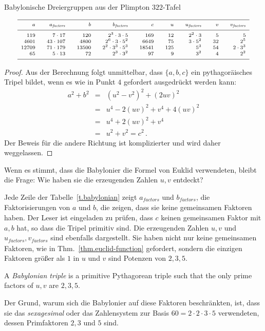 \begin{table}[b]
\caption{Babylonische Dreiergruppen aus der Plimpton $322$-Tafel}\label{t.babylonian}
\[
\begin{scriptsize}
\begin{array}{r@{$\quad\quad$}r@{$\quad\quad$}r@{$\quad\quad$}r@{$\quad\quad$}r@{$\quad\quad$}r@{$\quad\quad$}r@{$\quad\quad$}r@{$\quad\quad$}r}
\hline
\noalign{\smallskip}
a&a_{\textit{factors}}&b&b_{\textit{factors}}&c&u&u_{\textit{factors}}&v&v_{\textit{factors}}\\
\noalign{\smallskip}\hline\noalign{\smallskip}
119&7\cdot 17 &120&2^3 \cdot 3\cdot 5 & 169&12&2^2\cdot 3&5&5\\
4601 &43\cdot 107&4800&2^6 \cdot 3 \cdot 5^2& 6649&75&3\cdot 5^2&32&2^5\\
12709 &71\cdot 179&13500&2^2 \cdot 3^3 \cdot 5^3& 18541&125&5^3&54&2\cdot 3^3\\
65 &5\cdot 13&72&2^3 \cdot 3^2 & 97&9&3^2&4&2^2\\
\noalign{\smallskip}\hline
\end{array}
\end{scriptsize}
\]
\end{table}

\begin{proof}
Aus der Berechnung folgt unmittelbar, dass $\{a,b,c\}$ ein pythagoräisches Tripel bildet, wenn es wie in Punkt $4$ gefordert ausgedrückt werden kann:
\begin{eqnarray*}
a^2+b^2&=&(u^2-v^2)^2 + (2uv)^2\\
&=& u^4-2(uv)^2+v^4+4(uv)^2\\
&=&u^4+2(uv)^2+v^4\\
&=&u^2+v^2=c^2\,.
\end{eqnarray*}
Der Beweis für die andere Richtung ist komplizierter und wird daher weggelassen.
\end{proof}
Wenn es stimmt, dass die Babylonier die Formel von Euklid verwendeten, bleibt die Frage: Wie haben sie die erzeugenden Zahlen $u,v$ entdeckt?

Jede Zeile der Tabelle~\ref{t.babylonian} zeigt $a_{\textit{factors}}$ und $b_{\textit{factors}}$, die Faktorisierungen von $a$ und $b$, die zeigen, dass sie keine gemeinsamen Faktoren haben. Der Leser ist eingeladen zu prüfen, dass $c$ keinen gemeinsamen Faktor mit $a,b$ hat, so dass die Tripel primitiv sind. Die erzeugenden Zahlen $u,v$ und $u_{\textit{factors}}, v_{\textit{factors}}$ sind ebenfalls dargestellt. Sie haben nicht nur keine gemeinsamen Faktoren, wie in Thm.~\ref{thm.euclid-function} gefordert, sondern die einzigen Faktoren größer als $1$ in $u$ und $v$ sind Potenzen von $2,3,5$.
\begin{definition}
A \emph{Babylonian triple} is a primitive Pythagorean triple such that the only prime factors of $u,v$ are $2,3,5$.
\end{definition}
Der Grund, warum sich die Babylonier auf diese Faktoren beschränkten, ist, dass sie das \emph{sexagesimal} oder das Zahlensystem zur Basis $60=2\cdot 2\cdot 3\cdot 5$ verwendeten, dessen Primfaktoren $2,3$ und $5$ sind.

